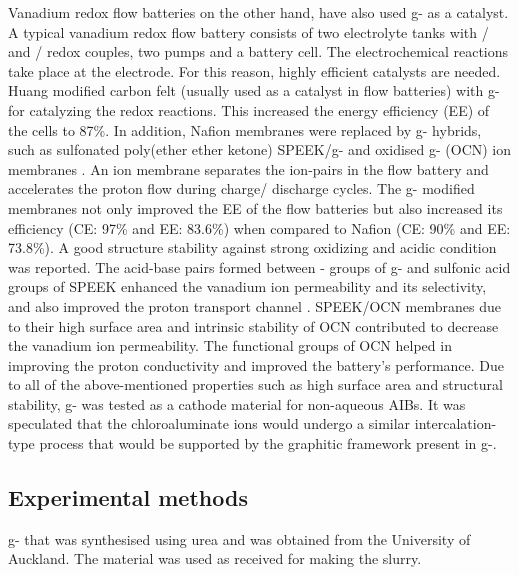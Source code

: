 Vanadium redox flow batteries on the other hand, have also used g- as a catalyst. A typical vanadium redox flow battery consists of two electrolyte tanks with / and / redox couples, two pumps and a battery cell. The electrochemical reactions take place at the electrode. For this reason, highly efficient catalysts are needed. Huang  modified carbon felt (usually used as a catalyst in flow batteries) with g- for catalyzing the redox reactions. This increased the energy efficiency (EE) of the cells to 87\%. In addition, Nafion membranes were replaced by g- hybrids, such as sulfonated poly(ether ether ketone) SPEEK/g- and oxidised g- (OCN) ion membranes \cite{niu_novel_2017, wang_novel_2017}. An ion membrane separates the ion-pairs in the flow battery and accelerates the proton flow during charge/ discharge cycles. The g- modified membranes not only improved the EE of the flow batteries but also increased its efficiency (CE: 97\% and EE: 83.6\%) when compared to Nafion (CE: 90\% and EE: 73.8\%). A good structure stability against strong oxidizing and acidic condition was reported. The acid-base pairs formed between - groups of g- and sulfonic acid groups of SPEEK enhanced the vanadium ion permeability and its selectivity, and also improved the proton transport channel \cite{wang_novel_2017}. SPEEK/OCN membranes due to their high surface area and intrinsic stability of OCN contributed to decrease the vanadium ion permeability. The functional groups of OCN helped in improving the proton conductivity and improved the battery's performance. Due to all of the above-mentioned properties such as high surface area and structural stability, g- was tested as a cathode material for non-aqueous AIBs. It was speculated that the chloroaluminate ions would undergo a similar intercalation-type process that would be supported by the graphitic framework present in g-.

\subsection{Experimental methods}
g- that was synthesised using urea and was obtained from the University of Auckland. The material was used as received for making the slurry. 


